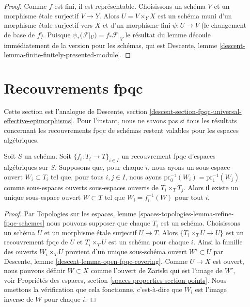 \begin{proof}
Comme $f$ est fini, il est représentable. Choisissons un schéma $V$ et un
morphisme \'etale surjectif $V \to Y$. Alors $U = V \times_Y X$ est un schéma muni d'un
morphisme \'etale surjectif vers $X$ et d'un morphisme fini
$\psi : U \to V$ (le changement de base de $f$). Puisque
$\psi_*(\mathcal{F}|_U) = f_*\mathcal{F}|_V$
le résultat du lemme découle immédiatement de la version pour les schémas, qui
est
Descente, lemme \ref{descent-lemma-finite-finitely-presented-module}.
\end{proof}






\section{Recouvrements fpqc}
\label{section-fpqc}

\noindent
Cette section est l'analogue de
Descente, section \ref{descent-section-fpqc-universal-effective-epimorphisms}.
Pour l'instant, nous ne savons pas si tous les résultats concernant les
recouvrements fpqc de schémas restent valables pour les espaces algébriques.

\begin{lemma}
\label{lemma-open-fpqc-covering}
Soit $S$ un schéma.
Soit $\{f_i : T_i \to T\}_{i \in I}$ un recouvrement fpqc
d'espaces algébriques sur $S$.
Supposons que, pour chaque $i$, nous ayons un sous-espace ouvert $W_i \subset T_i$
tel que, pour tous $i, j \in I$, nous ayons
$\text{pr}_0^{-1}(W_i) = \text{pr}_1^{-1}(W_j)$ comme sous-espaces ouverts
sous-espaces ouverts de $T_i \times_T T_j$. Alors il existe un unique sous-espace ouvert
$W \subset T$ tel que $W_i = f_i^{-1}(W)$ pour tout $i$.
\end{lemma}

\begin{proof}
Par
Topologies sur les espaces, lemme \ref{spaces-topologies-lemma-refine-fpqc-schemes}
nous pouvons supposer que chaque $T_i$ est un schéma.
Choisissons un schéma $U$ et un morphisme \'etale surjectif $U \to T$.
Alors $\{T_i \times_T U \to U\}$ est un recouvrement fpqc de $U$
et $T_i \times_T U$ est un schéma pour chaque $i$. Ainsi
la famille des ouverts $W_i \times_T U$ provient d'un unique
sous-schéma ouvert $W' \subset U$ par
Descente, lemme \ref{descent-lemma-open-fpqc-covering}.
Comme $U \to X$ est ouvert, nous pouvons définir $W \subset X$ comme l'ouvert de Zariski
qui est l'image de $W'$, voir
Propriétés des espaces, section \ref{spaces-properties-section-points}.
Nous omettons la vérification que cela fonctionne, c'est-à-dire que
$W_i$ est l'image inverse de $W$ pour chaque $i$.
\end{proof}

